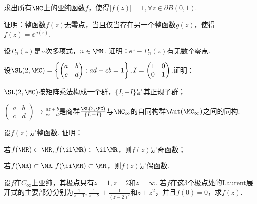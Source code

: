 \begin{xiti}
\item 求出所有$\MC$上的亚纯函数$f$，使得$|f(z)|=1,\forall z\in \partial B(0,1)$.
\item 证明：整函数$f(z)$无零点，当且仅当存在另一个整函数$g(z)$，使得$f(z)=\ee^{g(z)}$.
\item 设$P_n(z)$是$n$次多项式，$n\in\MN$. 证明：$\ee^z-P_n(z)$有无数个零点.
\item 设$\SL(2,\MC)=\left\{\begin{pmatrix}
a&b\\c&d
\end{pmatrix}:ad-cb=1\right\}, I=\begin{pmatrix}
1&0\\0&1
\end{pmatrix}$.证明：
\begin{enuma}
  \item $\SL(2,\MC)$按矩阵乘法构成一个群，$\{ I,- I\}$是其正规子群；
  \item $\begin{pmatrix}
    a&b\\c&d
  \end{pmatrix}\mapsto\frac{az+b}{cz+d}$是商群$\frac{\SL(2,\MC)}{\{ I,- I\}}$与$\MC_\infty$的自同构群$\Aut(\MC_\infty)$之间的同构.
\end{enuma}
\item 设$f(z)$是整函数. 证明：
\begin{enuma}
  \item 若$f(\MR)\subset \MR,f(\ii\MR)\subset \ii\MR$，则$f(z)$是奇函数；
  \item 若$f(\MR)\subset \MR,f(\ii\MR)\subset \MR$，则$f(z)$是偶函数.
\end{enuma}
\item 设$f$在$C_\infty$上亚纯，其极点只有$z=1,z=2$和$z=\infty$. 若$f$在这$3$个极点处的Laurent展开式的主要部分分别为$\frac1{z-1},\frac1{z-2}+\frac1{(z-2)^2}$和$z+z^2$，并且$f(0)=0$，求$f(z)$.
\end{xiti}

